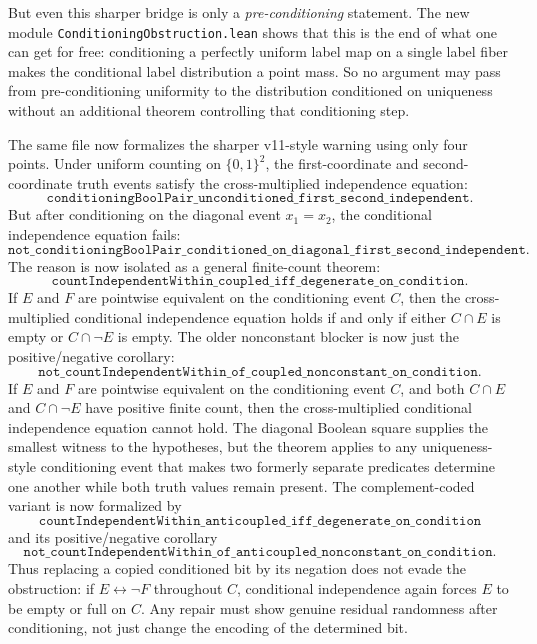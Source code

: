 \documentclass[11pt]{article}
\theoremstyle{remark}
\begin{document}
But even this sharper bridge is only a \emph{pre-conditioning} statement.  The new module
\texttt{ConditioningObstruction.lean} shows that this is the end of what one can get for free:
conditioning a perfectly uniform label map on a single label fiber makes the conditional label
distribution a point mass.  So no argument may pass from pre-conditioning uniformity to the
distribution conditioned on uniqueness without an additional theorem controlling that conditioning
step.

The same file now formalizes the sharper v11-style warning using only four points.  Under uniform
counting on \(\{0,1\}^2\), the first-coordinate and second-coordinate truth events satisfy the
cross-multiplied independence equation:
\[
  \texttt{conditioningBoolPair\_unconditioned\_first\_second\_independent}.
\]
But after conditioning on the diagonal event \(x_1=x_2\), the conditional independence equation
fails:
\[
  \texttt{not\_conditioningBoolPair\_conditioned\_on\_diagonal\_first\_second\_independent}.
\]
The reason is now isolated as a general finite-count theorem:
\[
  \texttt{countIndependentWithin\_coupled\_iff\_degenerate\_on\_condition}.
\]
If \(E\) and \(F\) are pointwise equivalent on the conditioning event \(C\), then the
cross-multiplied conditional independence equation holds if and only if either \(C\cap E\) is empty
or \(C\cap \neg E\) is empty.  The older nonconstant blocker is now just the positive/negative
corollary:
\[
  \texttt{not\_countIndependentWithin\_of\_coupled\_nonconstant\_on\_condition}.
\]
If \(E\) and \(F\) are pointwise equivalent on the conditioning event \(C\), and both \(C\cap E\)
and \(C\cap \neg E\) have positive finite count, then the cross-multiplied conditional
independence equation cannot hold.  The diagonal Boolean square supplies the smallest witness to
the hypotheses, but the theorem applies to any uniqueness-style conditioning event that makes two
formerly separate predicates determine one another while both truth values remain present.
The complement-coded variant is now formalized by
\[
  \texttt{countIndependentWithin\_anticoupled\_iff\_degenerate\_on\_condition}
\]
and its positive/negative corollary
\[
  \texttt{not\_countIndependentWithin\_of\_anticoupled\_nonconstant\_on\_condition}.
\]
Thus replacing a copied conditioned bit by its negation does not evade the obstruction: if
\(E\leftrightarrow\neg F\) throughout \(C\), conditional independence again forces \(E\) to be
empty or full on \(C\).  Any repair must show genuine residual randomness after conditioning, not
just change the encoding of the determined bit.
\end{document}
